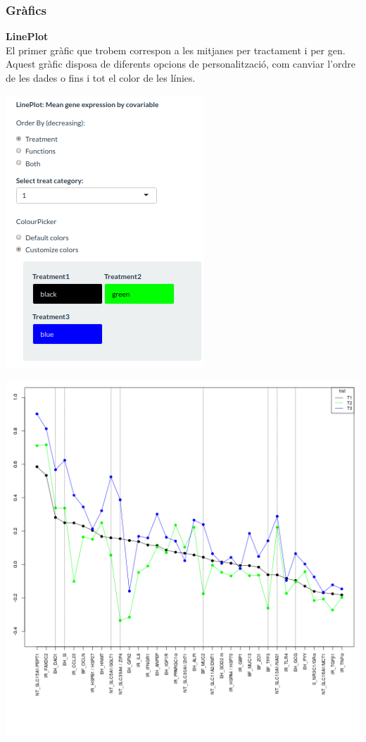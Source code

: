 \documentclass[english]{article}
\begin{document}
\subsubsection{Gràfics}
\noindent\textbf{LinePlot}\\

\noindent El primer gràfic que trobem correspon a les mitjanes per tractament i per gen. Aquest gràfic disposa de diferents opcions de personalització, com canviar l'ordre de les dades o fins i tot el color de les línies.
\begin{center}
\includegraphics[scale=0.5]{app7.png}
\end{center}
\clearpage
\begin{center}
\includegraphics[scale=0.3]{app8.png}
\end{center}
\end{document}
